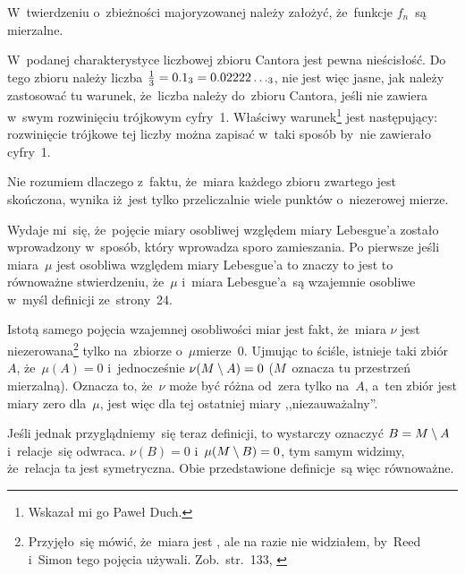 \documentclass[a4paper,11pt]{article}
\begin{document}
\vspace{\spaceFour}


\start {} W~twierdzeniu o~zbieżności majoryzowanej należy
założyć, że~funkcje $f_{ n }$~są mierzalne. %

\vspace{\spaceFour}


\start {} W~podanej charakterystyce liczbowej zbioru Cantora
jest pewna nieścisłość. Do tego zbioru należy liczba
$\frac{ 1 }{ 3 } = 0.1_{ 3 } = 0.02222\ldots_{ 3 }$, nie jest więc jasne,
jak należy zastosować tu warunek, że~liczba należy do~zbioru Cantora,
jeśli nie zawiera w~swym rozwinięciu trójkowym cyfry~1. Właściwy
warunek\footnote{Wskazał mi go Paweł Duch.} jest następujący:
rozwinięcie trójkowe tej liczby można zapisać w~taki sposób by~nie
zawierało cyfry~1. %

\vspace{\spaceFour}


\start {} Nie rozumiem dlaczego z~faktu, że~miara każdego zbioru
zwartego jest skończona, wynika iż~jest tylko przeliczalnie wiele
punktów o~niezerowej mierze. \Dok

\vspace{\spaceFour}


\start {} Wydaje mi~się, że~pojęcie miary osobliwej względem
miary Lebesgue'a zostało wprowadzony w~sposób, który wprowadza sporo
zamieszania. Po pierwsze jeśli miara~$\mu$ jest osobliwa względem
miary Lebesgue'a to znaczy to jest to równoważne stwierdzeniu,
że~$\mu$ i~miara Lebesgue'a~są wzajemnie osobliwe w~myśl definicji
ze~strony~24.

Istotą samego pojęcia wzajemnej osobliwości miar jest fakt, że~miara
$\nu$ jest niezerowana\footnote{Przyjęło~się mówić, że~miara jest
  , ale na razie nie widziałem, by~Reed i~Simon tego
  pojęcia używali. Zob.~str.~133, \cite{Rudin98}} tylko na~zbiorze
o~$\mu$\dywiz mierze~0. Ujmując to ściśle, istnieje taki zbiór~$A$,
że~$\mu( A ) = 0$ i~jednocześnie $\nu( M \setminus A ) = 0$ ($M$~oznacza
tu przestrzeń mierzalną). Oznacza to, że~$\nu$ może być różna od~zera
tylko na~$A$, a~ten zbiór jest miary zero dla~$\mu$, jest więc dla tej
ostatniej miary ,,niezauważalny''.

Jeśli jednak przyglądniemy~się teraz definicji, to wystarczy oznaczyć
$B = M \setminus A$ i~relacje~się odwraca. $\nu( B ) = 0$
i~$\mu( M \setminus B ) = 0$, tym samym widzimy, że~relacja ta jest
symetryczna. Obie przedstawione definicje~są więc równoważne.
\end{document}
